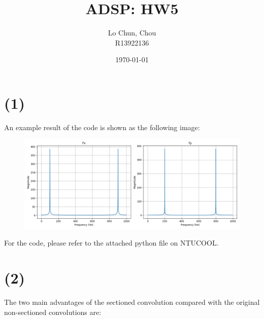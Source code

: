 \documentclass{article}
\title{ADSP: HW5}
\author{Lo Chun, Chou \\ R13922136}
\date\today
\begin{document}
\setlength{\parindent}{0pt}
\maketitle 



\section*{(1)}

An example result of the code is shown as the following image:

\begin{figure}[H]
    \centering
    \includegraphics[width=\textwidth]{problem_1/prob1_result.png}
\end{figure}

For the code, please refer to the attached python file on NTUCOOL.

\section*{(2)}

The two main advantages of the sectioned convolution 
compared with the original non-sectioned convolutions are:
\end{document}
